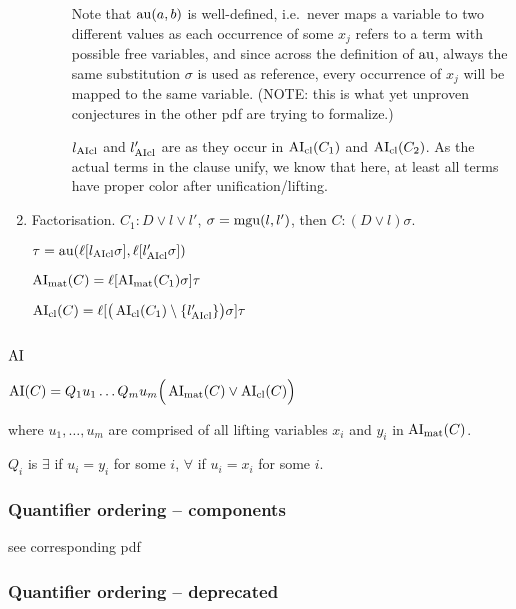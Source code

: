 \documentclass[,%
	paper=a4,%
	DIV12, %
	twoside=false,%
	liststotoc,
	bibtotoc,
	draft=false,%
	numbers=noendperiod
]{scrartcl}
\begin{document}
\begin{enumerate}
\begin{description}
				Note that $\operatorname{au}(a, b)$ is well-defined, i.e.~never maps a variable to two different values as each occurrence of some $x_j$ refers to a term with possible free variables, and since across the definition of $\operatorname{au}$, always the same substitution $\sigma$ is used as reference, every occurrence of $x_j$ will be mapped to the same variable. (NOTE: this is what yet unproven conjectures in the other pdf are trying to formalize.)


				$l_{\operatorname{AIcl}}$ and $l'_{\operatorname{AIcl}}$ are as they occur in $\operatorname{AI}_\mathrm{cl}(C_1)$ and $\operatorname{AI}_\mathrm{cl}(C_2)$. As the actual terms in the clause unify, we know that here, at least all terms have proper color after unification/lifting.


		\end{description}

	\item Factorisation. $C_1: D \lor l \lor l'$, $\sigma = \operatorname{mgu}(l, l')$, then $C: (D\lor l)\sigma$.

		$\tau = \operatorname{au}(\ell[l_{\operatorname{AIcl}}\sigma], \ell[l'_{\operatorname{AIcl}}\sigma])$

		$\operatorname{AI}_\mathrm{mat}(C) = \ell[\operatorname{AI}_\mathrm{mat}(C_1)\sigma]\tau$

		$\operatorname{AI}_\mathrm{cl}(C) = \ell[ \big(\operatorname{AI}_\mathrm{cl}(C_1) \setminus \{l'_{\operatorname{AIcl}}\}\big)\sigma]\tau$



\end{enumerate}

\subsection{$\operatorname{AI}$}


$\operatorname{AI}(C) = Q_1 u_1 \ldots Q_m u_m \Big( \operatorname{AI}_\mathrm{mat}(C) \lor \operatorname{AI}_\mathrm{cl}(C) \Big)$

where $u_1, \ldots, u_m$ are comprised of all lifting variables $x_i$ and $y_i$ in $\operatorname{AI}_\mathrm{mat}(C)$.


$Q_i$ is $\exists$ if $u_i = y_i$ for some $i$, $\forall$ if $u_i = x_i$ for some $i$.

\subsubsection{Quantifier ordering -- components}
see corresponding pdf

\subsubsection{Quantifier ordering -- deprecated}
\end{document}
